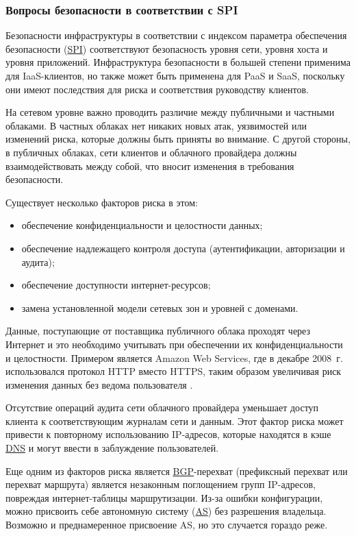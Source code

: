 \subsubsection{Вопросы безопасности в соответствии с SPI}

Безопасности инфраструктуры в соответствии с индексом параметра обеспечения безопасности (\hyperlink{spi}{SPI}) соответствуют безопасность уровня сети, уровня хоста и уровня приложений.
Инфраструктура безопасности в большей степени применима для IaaS-клиентов, но также может быть применена для PaaS и SaaS, поскольку они имеют последствия для риска и соответствия руководству клиентов.

На сетевом уровне важно проводить различие между публичными и частными облаками.
В частных облаках нет никаких новых атак, уязвимостей или изменений риска, которые должны быть приняты во внимание.
С другой стороны, в публичных облаках, сети клиентов и облачного провайдера должны взаимодействовать между собой, что вносит изменения в требования безопасности.

Существует несколько факторов риска в этом:
\begin{itemize}
  \item обеспечение конфиденциальности и целостности данных;
  \item обеспечение надлежащего контроля доступа (аутентификации, авторизации и аудита);
  \item обеспечение доступности интернет-ресурсов;
  \item замена установленной модели сетевых зон и уровней с доменами.
\end{itemize}

Данные, поступающие от поставщика публичного облака проходят через Интернет и это необходимо учитывать при обеспечении их конфиденциальности и целостности.
Примером является Amazon Web Services, где в декабре 2008~г. использовался протокол HTTP вместо HTTPS, таким образом увеличивая риск изменения данных без ведома пользователя \cite{aws}.

Отсутствие операций аудита сети облачного провайдера уменьшает доступ клиента к соответствующим журналам сети и данным.
Этот фактор риска может привести к повторному использованию IP-адресов, которые находятся в кэше \hyperlink{dns}{DNS} и могут ввести в заблуждение пользователей.

Еще одним из факторов риска является \hyperlink{bgp}{BGP}-перехват (префиксный перехват или перехват маршрута) является незаконным поглощением групп IP-адресов, повреждая интернет-таблицы маршрутизации.
Из-за ошибки конфигурации, можно присвоить себе автономную систему (\hyperlink{as}{AS}) без разрешения владельца.
Возможно и преднамеренное присвоение AS, но это случается гораздо реже.

